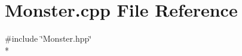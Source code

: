 \section{Monster.\-cpp File Reference}
\label{_monster_8cpp}
{\ttfamily \#include \char`\"{}Monster.\-hpp\char`\"{}}\\*
